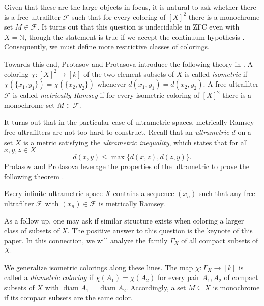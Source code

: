 Given that these are the large objects in focus, it is natural to ask whether there is a free ultrafilter \( \mathcal{F}  \) such that for every coloring of \( [X]^{2}  \) there is a monochrome set \( M \in \mathcal{F}  \). It turns out that this question is undecidable in ZFC even with \( X = \mathbb{N}  \), though the statement is true if we accept the continuum hypothesis \cite{protasov:2017}. Consequently, we must define more restrictive classes of colorings.

Towards this end, Protasov and Protasova introduce the following theory in \cite{protasov:2017}. A coloring \( \chi : [X]^{2} \to [k]  \) of the two-element subsets of \( X \) is called \emph{isometric} if \( \chi (\{ x_1, y_1 \} ) = \chi (\{ x_2, y_2 \} ) \) whenever \( d(x_1, y_1) = d(x_2, y_2) \). A free ultrafilter \( \mathcal{F}  \) is called \emph{metrically Ramsey} if for every isometric coloring of \( [X]^{2}  \) there is a monochrome set \( M \in \mathcal{F}  \).

It turns out that in the particular case of ultrametric spaces, metrically Ramsey free ultrafilters are not too hard to construct. Recall that an \emph{ultrametric} \( d \) on a set \( X \) is a metric satisfying the \emph{ultrametric inequality}, which states that for all \( x,y,z \in X \) \[ d(x,y) \leq \max \{ d(x,z), d(z,y) \}.  \] Protasov and Protasova leverage the properties of the ultrametric to prove the following theorem \cite{protasov:2017}.

\begin{theorem}
\label{thm:1}
Every infinite ultrametric space \( X \) contains a sequence \( (x_{n}) \) such that any free ultrafilter \( \mathcal{F}  \) with \( (x_{n}) \in \mathcal{F} \) is metrically Ramsey.
\end{theorem}

As a follow up, one may ask if similar structure exists when coloring a larger class of subsets of \( X \). The positive answer to this question is the keynote of this paper. In this connection, we will analyze the family \( \Gamma_{X}  \) of all compact subsets of \( X \).

We generalize isometric colorings along these lines. The map \( \chi : \Gamma_{X}  \to [k] \) is called a \emph{diametric coloring} if \( \chi (A_1) = \chi (A_2) \) for every pair \( A_1, A_2 \) of compact subsets of \( X \) with \( \operatorname{diam} A_1 = \operatorname{diam} A_2  \). Accordingly, a set \( M \subseteq X \) is monochrome if its compact subsets are the same color. 

